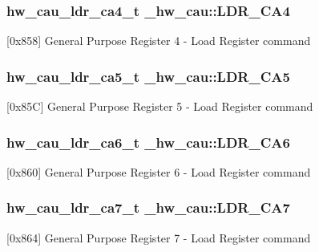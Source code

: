 \subsubsection[{\texorpdfstring{L\+D\+R\+\_\+\+C\+A4}{LDR_CA4}}]{ {\bf hw\+\_\+cau\+\_\+ldr\+\_\+ca4\+\_\+t} \+\_\+hw\+\_\+cau\+::\+L\+D\+R\+\_\+\+C\+A4}\hypertarget{struct__hw__cau_a316ea8bc7c67595473b7d8940970ded0}{}\label{struct__hw__cau_a316ea8bc7c67595473b7d8940970ded0}
\mbox{[}0x858\mbox{]} General Purpose Register 4 -\/ Load Register command 
\subsubsection[{\texorpdfstring{L\+D\+R\+\_\+\+C\+A5}{LDR_CA5}}]{ {\bf hw\+\_\+cau\+\_\+ldr\+\_\+ca5\+\_\+t} \+\_\+hw\+\_\+cau\+::\+L\+D\+R\+\_\+\+C\+A5}\hypertarget{struct__hw__cau_aac421511e8d41832d3d8ec03c924b384}{}\label{struct__hw__cau_aac421511e8d41832d3d8ec03c924b384}
\mbox{[}0x85C\mbox{]} General Purpose Register 5 -\/ Load Register command 
\subsubsection[{\texorpdfstring{L\+D\+R\+\_\+\+C\+A6}{LDR_CA6}}]{ {\bf hw\+\_\+cau\+\_\+ldr\+\_\+ca6\+\_\+t} \+\_\+hw\+\_\+cau\+::\+L\+D\+R\+\_\+\+C\+A6}\hypertarget{struct__hw__cau_a99f769435ffb2efa2cf6f12defaeeaba}{}\label{struct__hw__cau_a99f769435ffb2efa2cf6f12defaeeaba}
\mbox{[}0x860\mbox{]} General Purpose Register 6 -\/ Load Register command 
\subsubsection[{\texorpdfstring{L\+D\+R\+\_\+\+C\+A7}{LDR_CA7}}]{ {\bf hw\+\_\+cau\+\_\+ldr\+\_\+ca7\+\_\+t} \+\_\+hw\+\_\+cau\+::\+L\+D\+R\+\_\+\+C\+A7}\hypertarget{struct__hw__cau_add472ae5ef2536dd4eca65e9efb474d4}{}\label{struct__hw__cau_add472ae5ef2536dd4eca65e9efb474d4}
\mbox{[}0x864\mbox{]} General Purpose Register 7 -\/ Load Register command 
